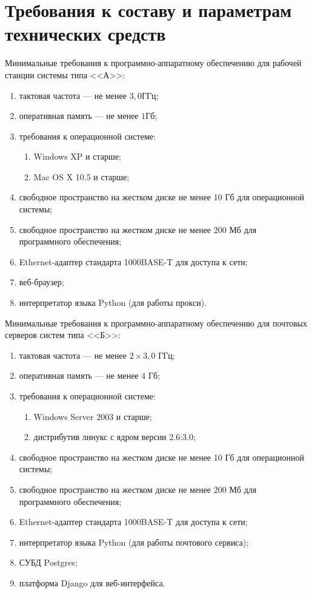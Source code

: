 \section{Требования к составу и параметрам технических средств}
Минимальные требования к программно-аппаратному обеспечению для рабочей станции системы типа <<А>>:

\begin{enumerate}
	\item тактовая частота  --- не менее $3,0 \text{ГГц}$; 
	\item оперативная память --- не менее $1 \text{Гб}$;
	\item требования к операционной системе:
	\begin{enumerate}
		\item Windows XP и старше;
		\item Mac OS X 10.5 и старше;
	\end{enumerate}
	\item свободное пространство на жестком диске не менее 10 Гб для операционной системы;
	\item свободное пространство на жестком диске не менее 200 Мб для программного обеспечения;
	\item Ethernet-адаптер стандарта 1000BASE-T для доступа к сети;
	\item веб-браузер;
	\item интерпретатор языка Python (для работы прокси).
\end{enumerate}

Минимальные требования к программно-аппаратному обеспечению для почтовых серверов систем типа <<Б>>:

\begin{enumerate}
	\item тактовая частота  --- не менее $2\times3,0$ ГГц; 
	\item оперативная память --- не менее $4$ Гб;
	\item требования к операционной системе:
	\begin{enumerate}
		\item Windows Server 2003 и старше;
		\item дистрибутив линукс с ядром версии 2.6:3.0;
	\end{enumerate}
	\item свободное пространство на жестком диске не менее 10 Гб для операционной системы;
	\item свободное пространство на жестком диске не менее 200 Мб для программного обеспечения;
	\item Ethernet-адаптер стандарта 1000BASE-T для доступа к сети;
	\item интерпретатор языка Python (для работы почтового сервиса);
	\item СУБД Postgres;	
	\item платформа Django для веб-интерфейса.
\end{enumerate}

